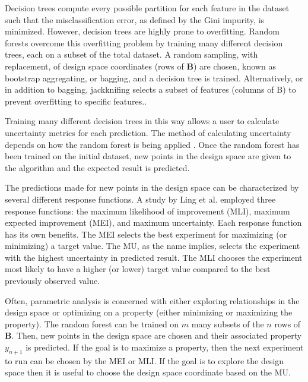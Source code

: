 Decision trees compute every possible partition for each feature in the dataset such that the misclassification error, as defined by the Gini impurity, is minimized. However, decision trees are highly prone to overfitting. Random forests overcome this overfitting problem by training many different decision trees, each on a subset of the total dataset. A random sampling, with replacement, of design space coordinates (rows of $\mathbf{B}$) are chosen, known as bootstrap aggregating, or bagging, and a decision tree is trained. Alternatively, or in addition to bagging, jackknifing selects a subset of features (columns of B) to prevent overfitting to specific features..

Training many different decision trees in this way allows a user to calculate uncertainty metrics for each prediction. The method of calculating uncertainty depends on how the random forest is being applied \cite{Ling2017a}. Once the random forest has been trained on the initial dataset, new points in the design space are given to the algorithm and the expected result is predicted. 

The predictions made for new points in the design space can be characterized by several different response functions. A study by Ling et al. employed three response functions: the maximum likelihood of improvement (MLI), maximum expected improvement (MEI), and maximum uncertainty. Each response function has its own benefits. The MEI selects the best experiment for maximizing (or minimizing) a target value. The MU, as the name implies, selects the experiment with the highest uncertainty in predicted result. The MLI chooses the experiment most likely to have a higher (or lower) target value compared to the best previously observed value.

Often, parametric analysis is concerned with either exploring relationships in the design space or optimizing on a property (either minimizing or maximizing the property). The random forest can be trained on $m$ many subsets of the $n$ rows of $\mathbf{B}$. Then, new points in the design space are chosen and their associated property $y_{n+1}$ is predicted. If the goal is to maximize a property, then the next experiment to run can be chosen by the MEI or MLI. If the goal is to explore the design space then it is useful to choose the design space coordinate based on the MU.

